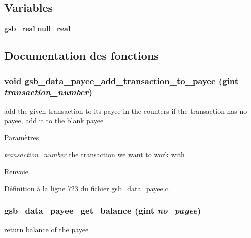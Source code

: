 \subsection*{Variables}
\begin{DoxyCompactItemize}
\item 
{\bf gsb\_\-real} {\bf null\_\-real}
\end{DoxyCompactItemize}


\subsection{Documentation des fonctions}
\subsubsection[{gsb\_\-data\_\-payee\_\-add\_\-transaction\_\-to\_\-payee}]{\setlength{\rightskip}{0pt plus 5cm}void gsb\_\-data\_\-payee\_\-add\_\-transaction\_\-to\_\-payee (gint {\em transaction\_\-number})}\label{gsb__data__payee_8c_ae57cf148af34346fc3d49bd1f313081d}
add the given transaction to its payee in the counters if the transaction has no payee, add it to the blank payee


\begin{DoxyParams}{Paramètres}
\item[{\em transaction\_\-number}]the transaction we want to work with\end{DoxyParams}
\begin{DoxyReturn}{Renvoie}

\end{DoxyReturn}


Définition à la ligne 723 du fichier gsb\_\-data\_\-payee.c.

\subsubsection[{gsb\_\-data\_\-payee\_\-get\_\-balance}]{ gsb\_\-data\_\-payee\_\-get\_\-balance (gint {\em no\_\-payee})}\label{gsb__data__payee_8c_a4d9141bf920954170d54a7a8d9127d4f}
return balance of the payee


